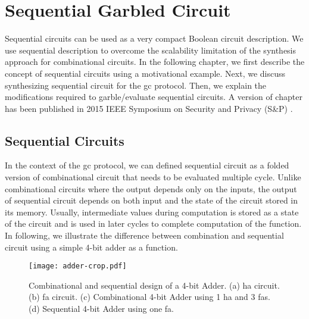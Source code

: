 \chapter{Sequential Garbled Circuit}\label{chap:seq}
Sequential circuits can be used as a very compact Boolean circuit description. We use sequential description to overcome the scalability limitation of the synthesis approach for combinational circuits.
In the following chapter, we first describe the concept of sequential circuits using a motivational example.
Next, we discuss synthesizing sequential circuit for the \acrshort{gc} protocol.
Then, we explain the modifications required to garble/evaluate sequential circuits.
A version of chapter has been published in 2015 IEEE Symposium on Security and Privacy (S\&P) \cite{songhori2015tinygarble}.

\section{Sequential Circuits}\label{sec:seq-seq}
In the context of the \acrshort{gc} protocol, we can defined sequential circuit as a folded version of combinational circuit that needs to be evaluated multiple cycle.
Unlike combinational circuits where the output depends only on the inputs, the output of sequential circuit depends on both input and the state of the circuit stored in its memory.
Usually, intermediate values during computation is stored as a state of the circuit and is used in later cycles to complete computation of the function.
In following, we illustrate the difference between combination and sequential circuit using a simple 4-bit adder as a function.

\begin{figure}
    \centering
    \texttt{[image: adder-crop.pdf]}
    \caption{Combinational and sequential design of a 4-bit Adder.
  (a) \acrshort{ha} circuit.
  (b) \acrshort{fa} circuit.
  (c) Combinational 4-bit Adder using 1 \acrshort{ha} and 3 \acrshort{fa}s.
  (d) Sequential 4-bit Adder using one \acrshort{fa}.}\label{fig:combSeq}
\end{figure}

